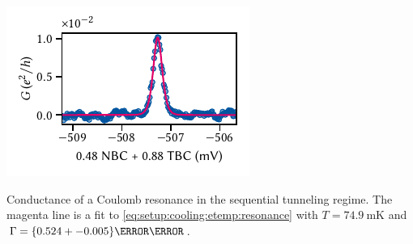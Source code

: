 \begin{marginfigure}
    \centering
    \includegraphics{img/pdf/setup/coulomb_resonance}
    \caption[]{
        Conductance of a Coulomb resonance in the sequential tunneling regime.
        The magenta line is a fit to \cref{eq:setup:cooling:etemp:resonance} with $T = \qty{74.9}{\milli\kelvin}$ and $\Gamma = \qty{0.524+-0.005}{\micro\eV}$.
    }
    \label{fig:setup:cooling:etemp:resonance}
\end{marginfigure}

